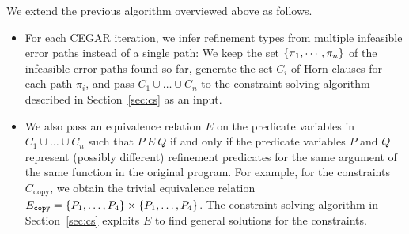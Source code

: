 We extend the previous algorithm overviewed above as follows.
\begin{itemize}
\item For each CEGAR iteration, we infer refinement types from multiple 
infeasible error paths instead of a single path:  We keep the set 
\(\{{\pi_1,\cdots,\pi_n}\}\) of the infeasible error paths found so far, 
generate the set \(C_i\) of Horn clauses for each path \(\pi_i\), and 
pass \(C_1 \cup \dots \cup C_n\) to the constraint solving algorithm 
described in Section~\ref{sec:cs} as an input.  %
\item We also pass an equivalence relation \(E\) on the predicate 
variables in \(C_1 \cup \dots \cup C_n\) such that \(P\ E\ Q\) if and 
only if the predicate variables \(P\) and \(Q\) represent (possibly 
different) refinement predicates for the same argument of the same 
function in the original program.  For example, for the constraints 
\(C_{\texttt{copy}}\), we obtain the trivial equivalence relation 
\(E_{\texttt{copy}}=\{{P_1,\dots,P_4}\} \times \{{P_1,\dots,P_4}\}\).  
The constraint solving algorithm in Section~\ref{sec:cs} exploits \(E\) 
to find general solutions for the constraints.
\end{itemize}



